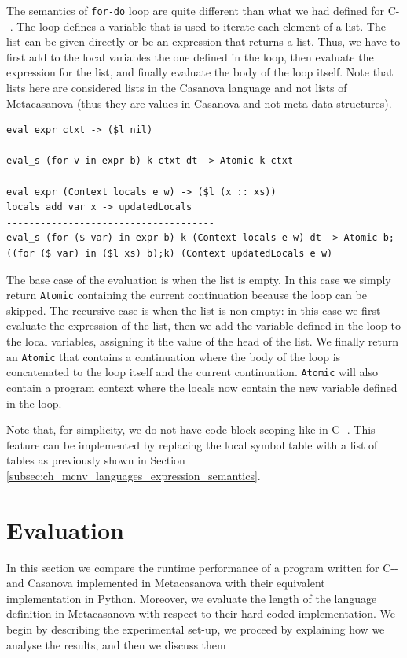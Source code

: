 \noindent
The semantics of \texttt{for-do} loop are quite different than what we had defined for C-{}-. The loop defines a variable that is used to iterate each element of a list. The list can be given directly or be an expression that returns a list. Thus, we have to first add to the local variables the one defined in the loop, then evaluate the expression for the list, and finally evaluate the body of the loop itself. Note that lists here are considered lists in the Casanova language and not lists of Metacasanova (thus they are values in Casanova and not meta-data structures).

\begin{lstlisting}
eval expr ctxt -> ($l nil)
------------------------------------------
eval_s (for v in expr b) k ctxt dt -> Atomic k ctxt

eval expr (Context locals e w) -> ($l (x :: xs))
locals add var x -> updatedLocals
-------------------------------------
eval_s (for ($ var) in expr b) k (Context locals e w) dt -> Atomic b;((for ($ var) in ($l xs) b);k) (Context updatedLocals e w)
\end{lstlisting}

\noindent
The base case of the evaluation is when the list is empty. In this case we simply return \texttt{Atomic} containing the current continuation because the loop can be skipped. The recursive case is when the list is non-empty: in this case we first evaluate the expression of the list, then we add the variable defined in the loop to the local variables, assigning it the value of the head of the list. We finally return an \texttt{Atomic} that contains a continuation where the body of the loop is concatenated to the loop itself and the current continuation. \texttt{Atomic} will also contain a program context where the locals now contain the new variable defined in the loop.

Note that, for simplicity, we do not have code block scoping like in C-{}-. This feature can be implemented by replacing the local symbol table with a list of tables as previously shown in Section \ref{subsec:ch_mcnv_languages_expression_semantics}.

\section{Evaluation}
\label{sec:ch_mcnv_languages_evaluation}
In this section we compare the runtime performance of a program written for C-{}- and Casanova implemented in Metacasanova with their equivalent implementation in Python. Moreover, we evaluate the length of the language definition in Metacasanova with respect to their hard-coded implementation. We begin by describing the experimental set-up, we proceed by explaining how we analyse the results, and then we discuss them

